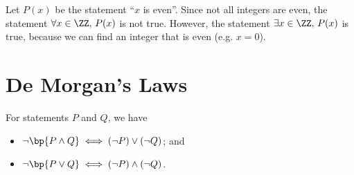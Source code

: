 \begin{example}[Quantifiers]
    Let $P(x)$ be the statement ``$x$ is even''. Since not all integers are even, the statement $\forall x \in \ZZ, \, P(x)$ is not true. However, the statement $\exists x \in \ZZ, \, P(x)$ is true, because we can find an integer that is even (e.g. $x = 0$).
\end{example}

\section{De Morgan's Laws}

\begin{proposition}
    For statements $P$ and $Q$, we have
    \begin{itemize}
        \item $\lnot \bp{P \land Q} \iff (\lnot P) \lor (\lnot Q)$; and
        \item $\lnot \bp{P \lor Q} \iff (\lnot P) \land (\lnot Q)$.
    \end{itemize}
\end{proposition}
